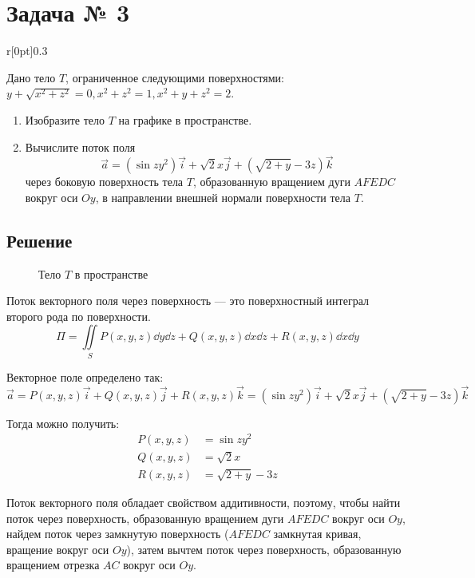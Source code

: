 \section{Задача № 3}

\begin{wrapfigure}{r}[0pt]{0.3\textwidth}
  \centering
\end{wrapfigure}

Дано тело \(T\), ограниченное следующими поверхностями:
\( y + \sqrt{x^2 + z^2} = 0, x^2 + z^2 = 1, x^2 + y + z^2 = 2\).

\begin{enumerate}
  \item Изобразите тело \(T\) на графике в пространстве.
  \item Вычислите поток поля
    \[
      \vec{a} = (\sin{zy^2})\vec{i}
      + \sqrt{2} x \vec{j}
      + (\sqrt{2+y}-3z)\Vec{k}
    \]
    через боковую поверхность тела \(T\), образованную вращением дуги \(AFEDC\)
    вокруг оси \(Oy\), в направлении внешней нормали поверхности тела \(T\).
\end{enumerate}

\subsection{Решение}

\begin{figure}[!htbp]
  \centering
  \caption{Тело \(T\) в пространстве}
\end{figure}

Поток векторного поля через поверхность ---
это поверхностный интеграл второго рода по поверхности.
\[
  \Pi =
  \iint\limits_{S} P(x,y,z) \dd y \dd z
  + Q(x,y,z) \dd x \dd z
  + R(x,y,z) \dd x \dd y
\]

Векторное поле определено так:
\[
  \vec{a}
  = P(x,y,z)\vec{i} + Q(x,y,z)\vec{j} + R(x,y,z)\vec{k}
  = (\sin{zy^2})\vec{i} + \sqrt{2}x\vec{j} + (\sqrt{2+y}-3z)\vec{k}
\]

Тогда можно получить:
\begin{align*}
  P(x,y,z) &= \sin{z y^2} \\
  Q(x,y,z) &= \sqrt{2}x \\
  R(x,y,z) &= \sqrt{2 + y} - 3z
\end{align*}

Поток векторного поля обладает свойством аддитивности,
поэтому, чтобы найти поток через поверхность,
образованную вращением дуги \(AFEDC\) вокруг оси \(Oy\),
найдем поток через замкнутую поверхность
(\(AFEDC\) замкнутая кривая, вращение вокруг оси \(Oy\)),
затем вычтем поток через поверхность,
образованную вращением отрезка \(AC\) вокруг оси \(Oy\).

